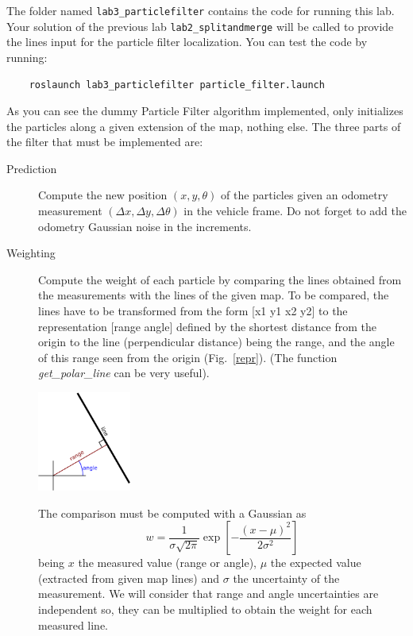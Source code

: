\documentclass[a4paper,10pt]{article}
\begin{document}
The folder named \texttt{lab3\_particlefilter} contains the code for running this lab. Your solution of the previous lab \texttt{lab2\_splitandmerge} will be called to provide the lines input for the particle filter localization. You can test the code by running:

\begin{verbatim}
    roslaunch lab3_particlefilter particle_filter.launch
\end{verbatim}

As you can see the dummy Particle Filter algorithm implemented, only initializes the particles along a given extension of the map, nothing else. The three parts of the filter that must be implemented are:

\begin{description}
    \item[Prediction] Compute the new position $(x, y, \theta)$ of the particles given an odometry measurement $(\Delta x, \Delta y, \Delta \theta )$ in the vehicle frame. Do not forget to add the odometry Gaussian noise in the increments.
    
    \item[Weighting] Compute the weight of each particle by comparing the lines obtained from the measurements with the lines of the given map. To be compared, the lines have to be transformed from the form [x1 y1 x2 y2] to the representation [range angle] defined by the shortest distance from the origin to the line (perpendicular distance) being the range, and the angle of this range seen from the origin (Fig.~\ref{repr}). (The function \textit{get\_polar\_line} can be very useful).
    
    \begin{center}
        \includegraphics[width=0.25\textwidth]{pict/lab3-repr}
        \label{repr}
    \end{center}
    
    The comparison must be computed with a Gaussian as
    \begin{equation}
        w = \frac{1}{\sigma \sqrt{2 \pi}} \exp \left[ - \frac{(x - \mu)^2}{2 \sigma^2} \right]
    \end{equation}
    being $x$ the measured value (range or angle), $\mu$ the expected value (extracted from given map lines) and $\sigma$ the uncertainty of the measurement. We will consider that range and angle uncertainties are independent so, they can be multiplied to obtain the weight for each measured line.
    

\end{description}
\end{document}
